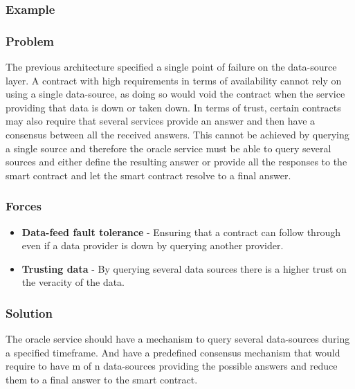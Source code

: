 \subsubsection{Example}

\subsubsection{Problem}
The previous architecture specified a single point of failure on the data-source layer. A contract with high requirements in terms of availability cannot rely on using a single data-source, as doing so would void the contract when the service providing that data is down or taken down. In terms of trust, certain contracts may also require that several services provide an answer and then have a consensus between all the received answers. This cannot be achieved by querying a single source and therefore the oracle service must be able to query several sources and either define the resulting answer or provide all the responses to the smart contract and let the smart contract resolve to a final answer.

\subsubsection{Forces}
\begin{itemize}
  \item \textbf{Data-feed fault tolerance} - Ensuring that a contract can follow through even if a data provider is down by querying another provider.
  \item \textbf{Trusting data} - By querying several data sources there is a higher trust on the veracity of the data.
\end{itemize}

\subsubsection{Solution}
The oracle service should have a mechanism to query several data-sources during a specified timeframe. And have a predefined consensus mechanism that would require to have m of n data-sources providing the possible answers and reduce them to a final answer to the smart contract.


